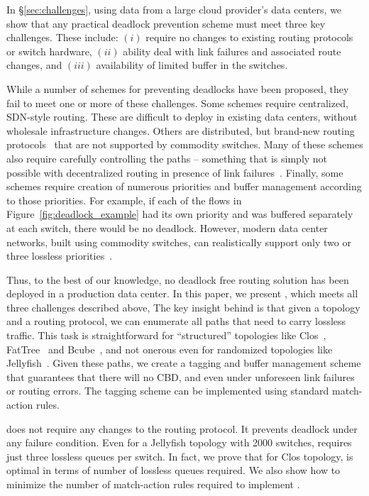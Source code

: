 In \S\ref{sec:challenges}, using data from a large cloud provider's data
centers, we show that any practical deadlock prevention scheme must meet three
key challenges. These include: $(i)$ require no changes to existing routing
protocols or switch hardware, $(ii)$ ability deal with link failures and
associated  route changes, and $(iii)$ availability of limited buffer in
the switches.

While a number of schemes for preventing deadlocks have been proposed, they fail
to meet one or more of these challenges.  Some schemes require centralized,
SDN-style routing.  These are difficult to deploy in existing data centers,
without wholesale infrastructure changes.  Others are distributed, but brand-new
routing protocols~\cite{tcpbolt} that are not supported by commodity switches.
Many of these schemes also require carefully controlling the paths -- something
that is simply not possible with decentralized routing in presence of link
failures~\cite{netpilot}.  Finally, some schemes require creation of numerous
priorities and buffer management according to those priorities. For example, if
each of the flows in Figure~\ref{fig:deadlock_example} had its own priority and
was buffered separately at each switch, there would be no deadlock.  However,
modern data center networks, built using commodity switches, can realistically
support only two or three lossless priorities~\cite{rdmaatscale}.

Thus, to the best of our knowledge, no deadlock free routing solution has been
deployed in a production data center.  In this paper, we present \sysname{},
which meets all three challenges described above, The key insight behind
\sysname{} is that given a topology and a routing protocol, we can enumerate all
paths that need to carry lossless traffic. This task is straightforward for
``structured'' topologies like Clos~\cite{clos}, FatTree~\cite{fattree} and
Bcube~\cite{bcube}, and not onerous even for randomized topologies like
Jellyfish~\cite{jellyfish}.  Given these paths, we create a tagging and buffer
management scheme that guarantees that there will no CBD, and even under
unforeseen link failures or routing errors. The tagging scheme can be
implemented using standard match-action rules.

\sysname{} does not require any changes to the routing protocol. It prevents
deadlock under any failure condition. Even for a Jellyfish topology with 2000
switches, \sysname{} requires just three lossless queues per switch.  In fact,
we prove that for Clos topology,  \sysname{} is optimal in terms of number of
lossless queues required.  We also show how to minimize the number of
match-action rules required to implement \sysname{}.

